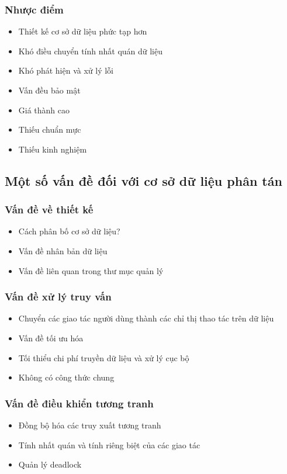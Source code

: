 \documentclass[12pt,a4paper]{report}
\begin{document}
\subsubsection{Nhược điểm}
\begin{itemize}
	\item Thiết kế cơ sở dữ liệu phức tạp hơn
	\item Khó điều chuyển tính nhất quán dữ liệu
	\item Khó phát hiện và xử lý lỗi
	\item Vấn đều bảo mật
	\item Giá thành cao
	\item Thiếu chuẩn mực
	\item Thiếu kinh nghiệm
\end{itemize}
\subsection{Một số vấn đề đối với cơ sở dữ liệu phân tán}
\subsubsection{Vấn đề về thiết kế}
\begin{itemize}
	\item Cách phân bố cơ sở dữ liệu?
	\item Vấn đề nhân bản dữ liệu
	\item Vấn đề liên quan trong thư mục quản lý
\end{itemize}
\subsubsection{Vấn đề xử lý truy vấn}
\begin{itemize}
	\item Chuyển các giao tác người dùng thành các chỉ thị thao tác trên dữ liệu
	\item Vấn đề tối ưu hóa
	\item Tối thiểu chi phí truyền dữ liệu và xử lý cục bộ
	\item Không có công thức chung
\end{itemize}
\subsubsection{Vấn đề điều khiển tương tranh}
\begin{itemize}
	\item Đồng bộ hóa các truy xuất tương tranh
	\item Tính nhất quán và tính riêng biệt của các giao tác
	\item Quản lý deadlock
\end{itemize}
\end{document}
